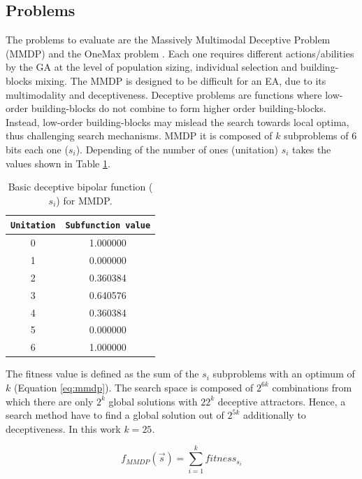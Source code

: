 \documentclass[final,1p,times]{elsarticle}
\begin{document}
\subsection{Problems}
The problems to evaluate are the Massively Multimodal Deceptive Problem (MMDP) \cite{goldberg92massive} and the OneMax problem \cite{ONEMAX}. Each one requires different actions/abilities by the GA at the level of population sizing, individual selection and building-blocks mixing. The MMDP
 is designed to be difficult for an EA, due to
its multimodality and deceptiveness. Deceptive problems are functions where low-order building-blocks do not combine to form higher order building-blocks. Instead, low-order building-blocks may mislead the search towards local optima, thus challenging search mechanisms. MMDP it is composed of $k$ subproblems of 6 bits each one ($s_i$). Depending of
the number of ones (unitation) $s_i$ takes the values shown in Table \ref{table:mmdpvalues}.  

\begin{table}

\centering
{%
\caption{ Basic deceptive bipolar function ($s_i$) for MMDP.}
\label{table:mmdpvalues}
\begin{tabular}{|c|c|}
\hline
\texttt{Unitation}&\texttt{Subfunction value}\\
\hline
0 & 1.000000 \\
\hline
1 & 0.000000 \\
\hline
2 & 0.360384 \\
\hline
3 & 0.640576\\
\hline
4 & 0.360384\\
\hline
5 & 0.000000\\
\hline
6 & 1.000000\\
\hline

\end{tabular}
}


\end{table}



The fitness value is defined as the sum of the $s_i$ subproblems with an optimum of $k$ (Equation \ref{eq:mmdp}).
The search space is composed of $2^{6k}$ combinations from which there
are only $2^k$ global solutions with $22^k$ deceptive
attractors. Hence, a search method have to find a global solution
out of $2^{5k}$ additionally to deceptiveness. In this work $k=25$. 

\begin{equation}\label{eq:mmdp}
f_{MMDP}(\vec s)= \sum_{i=1}^{k} fitness_{s_i}
\end{equation}
\end{document}
